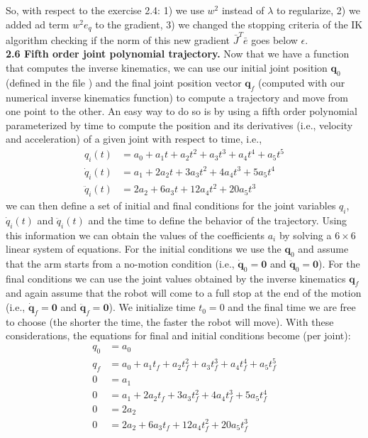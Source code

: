 \documentclass[11pt]{article}
\begin{document}
So, with respect to the exercise 2.4: 1) we use $w^2$ instead of $\lambda $ to regularize, 2) we added ad term $w^2 e_q $ to the gradient, 3) we changed the stopping criteria of the IK algorithm checking if the norm of this new gradient $\bar{J}^T\bar{e}$ goes below $\epsilon$.\\


\textbf{2.6 Fifth order joint polynomial trajectory.} Now that we have a function that computes the inverse kinematics, we can use our initial joint position $\mathbf{q}_0$(defined in the file ) and the final joint position vector $\mathbf{q}_f$ (computed with our numerical inverse kinematics function) to compute a trajectory and move from one point to the other. An easy way to do so is by using a fifth order polynomial parameterized by time to compute the position and its derivatives (i.e., velocity and acceleration) of a given joint with respect to time, i.e.,
\begin{align*}
	q_i(t) &= a_0  + a_1 t +  a_2 t^2 + a_3 t^3 + a_4 t^4 + a_5 t^5\\
	\dot{q}_i(t) &= a_1 + 2 a_2 t + 3a_3 t^2 + 4 a_4 t^3 + 5 a_5 t^4\\
	\ddot{q}_i(t) &= 2 a_2 + 6 a_3 t + 12 a_4 t^2 + 20 a_5 t^3
\end{align*} 
we can then define a set of initial and final conditions for the joint variables $q_i$, $\dot{q}_i(t)$ and $\ddot{q}_i(t)$ and the time to define the behavior of the trajectory. Using this information we can obtain the values of the coefficients $a_i$ by solving a $6\times 6$ linear system of equations. For the initial conditions we use the $\mathbf{q}_0$ and assume that the arm starts from a no-motion condition (i.e., $\dot{\mathbf{q}}_0 = \mathbf{0}$ and $\ddot{\mathbf{q}}_0 = \mathbf{0}$). For the final conditions we can use the joint values obtained by the inverse kinematics $\mathbf{q}_f$ and again assume that the robot will come to a full stop at the end of the motion (i.e., $\dot{\mathbf{q}}_f = \mathbf{0}$ and $\ddot{\mathbf{q}}_f = \mathbf{0}$). We initialize time $t_0 = 0$ and the final time we are free to choose (the shorter the time, the faster the robot will move). With these considerations, the equations for final and initial conditions become (per joint):
\begin{align*}
	q_0 &= a_0  \\
	q_f &= a_0  + a_1 t_f +  a_2 t_f^2 + a_3 t_f^3 + a_4 t_f^4 + a_5 t_f^5\\
	0 &= a_1 \\
	0 &= a_1 + 2 a_2 t_f + 3a_3 t_f^2 + 4 a_4 t_f^3 + 5 a_5 t_f^4\\
	0 &= 2 a_2 \\
	0 &= 2 a_2 + 6 a_3 t_f + 12 a_4 t_f^2 + 20 a_5 t_f^3
\end{align*}
\end{document}
